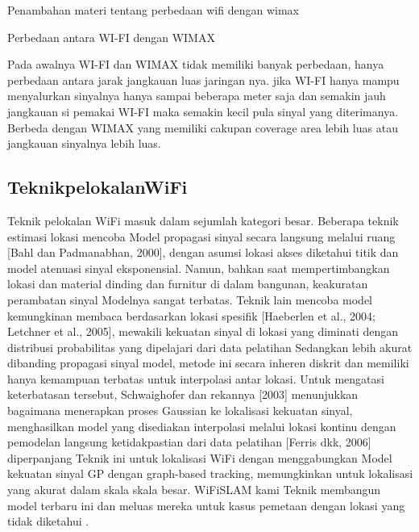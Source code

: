 Penambahan materi tentang perbedaan wifi dengan wimax


Perbedaan antara WI-FI dengan WIMAX

Pada awalnya WI-FI dan WIMAX tidak memiliki banyak perbedaan, hanya perbedaan antara jarak jangkauan luas jaringan nya.
jika WI-FI hanya mampu menyalurkan sinyalnya hanya sampai beberapa meter saja dan semakin jauh jangkauan si pemakai WI-FI maka
semakin kecil pula sinyal yang diterimanya. Berbeda dengan WIMAX yang memiliki cakupan coverage area lebih luas atau jangkauan 
sinyalnya lebih luas.

\subsection{TeknikpelokalanWiFi}

Teknik pelokalan WiFi masuk dalam sejumlah kategori besar. Beberapa teknik estimasi lokasi mencoba Model propagasi sinyal secara 
langsung melalui ruang [Bahl dan Padmanabhan, 2000], dengan asumsi lokasi akses diketahui titik dan model atenuasi sinyal eksponensial. 
Namun, bahkan saat mempertimbangkan lokasi dan material dinding dan furnitur di dalam bangunan, keakuratan perambatan sinyal Modelnya 
sangat terbatas. Teknik lain mencoba model kemungkinan membaca berdasarkan lokasi spesifik [Haeberlen et al., 2004; Letchner et al., 
2005], mewakili kekuatan sinyal di lokasi yang diminati dengan distribusi probabilitas yang dipelajari dari data pelatihan Sedangkan 
lebih akurat dibanding propagasi sinyal model, metode ini secara inheren diskrit dan memiliki hanya kemampuan terbatas untuk interpolasi 
antar lokasi. Untuk mengatasi keterbatasan tersebut, Schwaighofer dan rekannya [2003] menunjukkan bagaimana menerapkan proses Gaussian 
ke lokalisasi kekuatan sinyal, menghasilkan model yang disediakan interpolasi melalui lokasi kontinu dengan pemodelan langsung
ketidakpastian dari data pelatihan [Ferris dkk, 2006] diperpanjang Teknik ini untuk lokalisasi WiFi dengan menggabungkan Model kekuatan 
sinyal GP dengan graph-based tracking, memungkinkan untuk lokalisasi yang akurat dalam skala skala besar. WiFiSLAM kami Teknik membangun 
model terbaru ini dan meluas mereka untuk kasus pemetaan dengan lokasi yang tidak diketahui \cite{}.

